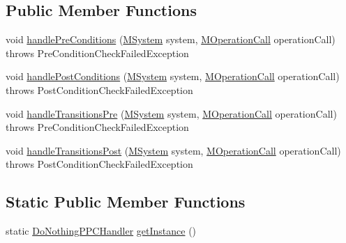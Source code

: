 \subsection*{Public Member Functions}
\begin{DoxyCompactItemize}
\item 
void \hyperlink{classorg_1_1tzi_1_1use_1_1uml_1_1sys_1_1ppc_handling_1_1_do_nothing_p_p_c_handler_a5901c0da9ea1f3ce2b518052fa2df40c}{handle\-Pre\-Conditions} (\hyperlink{classorg_1_1tzi_1_1use_1_1uml_1_1sys_1_1_m_system}{M\-System} system, \hyperlink{classorg_1_1tzi_1_1use_1_1uml_1_1sys_1_1_m_operation_call}{M\-Operation\-Call} operation\-Call)  throws Pre\-Condition\-Check\-Failed\-Exception 
\item 
void \hyperlink{classorg_1_1tzi_1_1use_1_1uml_1_1sys_1_1ppc_handling_1_1_do_nothing_p_p_c_handler_a0c9cdd50714082f209e12bc03daf2d07}{handle\-Post\-Conditions} (\hyperlink{classorg_1_1tzi_1_1use_1_1uml_1_1sys_1_1_m_system}{M\-System} system, \hyperlink{classorg_1_1tzi_1_1use_1_1uml_1_1sys_1_1_m_operation_call}{M\-Operation\-Call} operation\-Call)  throws Post\-Condition\-Check\-Failed\-Exception 
\item 
void \hyperlink{classorg_1_1tzi_1_1use_1_1uml_1_1sys_1_1ppc_handling_1_1_do_nothing_p_p_c_handler_a0fdb9098cb054316d4df136615878ad5}{handle\-Transitions\-Pre} (\hyperlink{classorg_1_1tzi_1_1use_1_1uml_1_1sys_1_1_m_system}{M\-System} system, \hyperlink{classorg_1_1tzi_1_1use_1_1uml_1_1sys_1_1_m_operation_call}{M\-Operation\-Call} operation\-Call)  throws Pre\-Condition\-Check\-Failed\-Exception 
\item 
void \hyperlink{classorg_1_1tzi_1_1use_1_1uml_1_1sys_1_1ppc_handling_1_1_do_nothing_p_p_c_handler_acb4c790f6de149456bc6044a006db5f9}{handle\-Transitions\-Post} (\hyperlink{classorg_1_1tzi_1_1use_1_1uml_1_1sys_1_1_m_system}{M\-System} system, \hyperlink{classorg_1_1tzi_1_1use_1_1uml_1_1sys_1_1_m_operation_call}{M\-Operation\-Call} operation\-Call)  throws Post\-Condition\-Check\-Failed\-Exception 
\end{DoxyCompactItemize}
\subsection*{Static Public Member Functions}
\begin{DoxyCompactItemize}
\item 
static \hyperlink{classorg_1_1tzi_1_1use_1_1uml_1_1sys_1_1ppc_handling_1_1_do_nothing_p_p_c_handler}{Do\-Nothing\-P\-P\-C\-Handler} \hyperlink{classorg_1_1tzi_1_1use_1_1uml_1_1sys_1_1ppc_handling_1_1_do_nothing_p_p_c_handler_a490dd69c06ed85ed8b1ecdea732b7508}{get\-Instance} ()
\end{DoxyCompactItemize}


